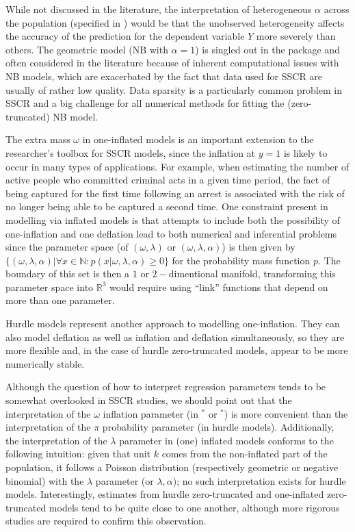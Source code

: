 \documentclass[
]{jss}
\newcommand{\1}{\mathcal{I}} \newcommand{\bZero}{\boldsymbol{0}}
\begin{document}
While not discussed in the literature, the interpretation of
heterogeneous \(\alpha\) across the population (specified in
) would be that the unobserved heterogeneity affects
the accuracy of the prediction for the dependent variable \(Y\) more
severely than others. The geometric model (NB with \(\alpha=1\)) is
singled out in the package and often considered in the literature
because of inherent computational issues with NB models, which are
exacerbated by the fact that data used for SSCR are usually of rather
low quality. Data sparsity is a particularly common problem in SSCR and
a big challenge for all numerical methods for fitting the
(zero-truncated) NB model.

The extra mass \(\omega\) in one-inflated models is an important
extension to the researcher's toolbox for SSCR models, since the
inflation at \(y=1\) is likely to occur in many types of applications.
For example, when estimating the number of active people who committed
criminal acts in a given time period, the fact of being captured for the
first time following an arrest is associated with the risk of no longer
being able to be captured a second time. One constraint present in
modelling via inflated models is that attempts to include both the
possibility of one-inflation and one deflation lead to both numerical
and inferential problems since the parameter space (of
\((\omega, \lambda)\) or \((\omega, \lambda, \alpha)\)) is then given by
\(\{(\omega, \lambda, \alpha) | \forall x\in \mathbb{N}: p(x|\omega, \lambda, \alpha)\geq0\}\)
for the probability mass function \(p\). The boundary of this set is
then a \(1\) or \(2-\)dimentional manifold, transforming this parameter
space into \(\mathbb{R}^{3}\) would require using ``link'' functions
that depend on more than one parameter.

Hurdle models represent another approach to modelling one-inflation.
They can also model deflation as well as inflation and deflation
simultaneously, so they are more flexible and, in the case of hurdle
zero-truncated models, appear to be more numerically stable.

Although the question of how to interpret regression parameters tends to
be somewhat overlooked in SSCR studies, we should point out that the
interpretation of the \(\omega\) inflation parameter (in
\(^\ast\) or \(^\ast\)) is more convenient than
the interpretation of the \(\pi\) probability parameter (in hurdle
models). Additionally, the interpretation of the \(\lambda\) parameter
in (one) inflated models conforms to the following intuition: given that
unit \(k\) comes from the non-inflated part of the population, it
follows a Poisson distribution (respectively geometric or negative
binomial) with the \(\lambda\) parameter (or \(\lambda,\alpha\)); no
such interpretation exists for hurdle models. Interestingly, estimates
from hurdle zero-truncated and one-inflated zero-truncated models tend
to be quite close to one another, although more rigorous studies are
required to confirm this observation.
\end{document}
